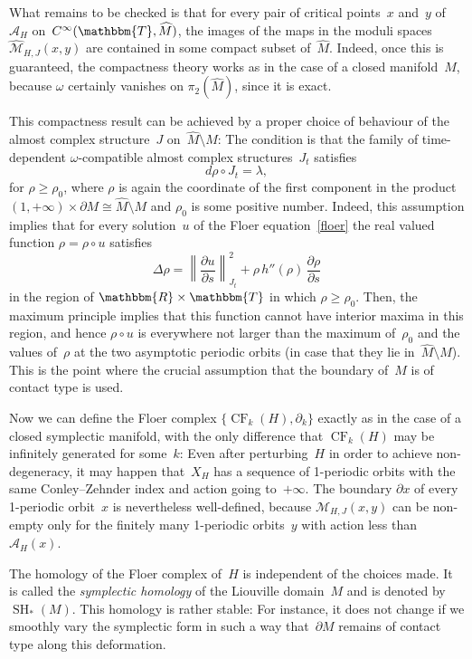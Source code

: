 \documentclass[12pt,twoside]{amsart}
\theoremstyle{plain}
\numberwithin{figure}{section}
\numberwithin{equation}{section}
\def\CF{\operatorname{CF}}
\def\SH{\operatorname{SH}}
\def\ca{{\mathcal A}}
\def\RR{\mathbbm{R}}
\def\TT{\mathbbm{T}}
\begin{document}
What remains to be checked is that for every pair of critical points~$x$ and~$y$ 
of~$\ca_H$ on~$C^{\infty}(\TT,\widehat{M})$, the images of the maps in the moduli spaces 
$\widehat{\mathcal{M}}_{H,J}(x,y)$ are contained in some compact subset of~$\widehat{M}$. 
Indeed, once this is guaranteed, the compactness theory works as in the case of 
a closed manifold~$M$, because $\omega$ certainly vanishes on $\pi_2(\widehat{M})$, 
since it is exact. 

This compactness result can be achieved by a proper choice of behaviour of the almost complex structure~$J$ 
on~$\widehat{M} \setminus M$: 
The condition is that the family of time-dependent $\omega$-compatible 
almost complex structures~$J_t$ satisfies
%
\begin{equation} \label{e:rJ}
d\rho \circ J_t = \lambda,
\end{equation}
for $\rho \geqslant \rho_0$, where $\rho$ is again the coordinate of the first component in the product $(1,+\infty) \times \partial M \cong \widehat{M} \setminus M$ and $\rho_0$ is some positive number. Indeed, this assumption implies that for every solution~$u$ 
of the Floer equation~\eqref{floer} the real valued function $\rho = \rho \circ u$ satisfies
\[
\Delta \rho = \left\| \frac{\partial u}{\partial s} \right\|_{J_t}^2 + \rho \, h''(\rho) \, \frac{\partial \rho}{\partial s}
\]
in the region of $\RR \times \TT$ in which $\rho \geqslant \rho_0$. Then, the maximum principle implies that this function cannot have interior maxima in this region, and hence $\rho \circ u$ is everywhere not larger than the maximum of~$\rho_0$ and the values of~$\rho$ at the two
asymptotic periodic orbits (in case that they lie in~$\widehat M \setminus M$). 
This is the point where the crucial assumption that the boundary of~$M$ is of contact type 
is used. 

Now we can define the Floer complex $\{\CF_k(H),\partial_k\}$ exactly as in the case of a 
closed symplectic manifold, with the only difference that $\CF_k(H)$ may be infinitely generated for some~$k$: Even after perturbing~$H$ in order to achieve non-degeneracy, 
it may happen that~$X_H$ has a sequence of 1-periodic orbits with the same Conley--Zehnder index and action going to~$+\infty$. The boundary $\partial x$ of every 1-periodic orbit~$x$ is nevertheless well-defined, because $\mathcal{M}_{H,J}(x,y)$ can be non-empty only for the finitely many 1-periodic orbits~$y$ with action less than~$\ca_H(x)$.
 
The homology of the Floer complex of~$H$ is independent of the choices made. It is called the 
{\em symplectic homology}\/ of the Liouville domain~$M$ and is denoted by~$\SH_*(M)$. 
This homology is rather stable: For instance, it does not change if we smoothly vary the symplectic form 
in such a way that~$\partial M$ remains of contact type along this deformation.
\end{document}
